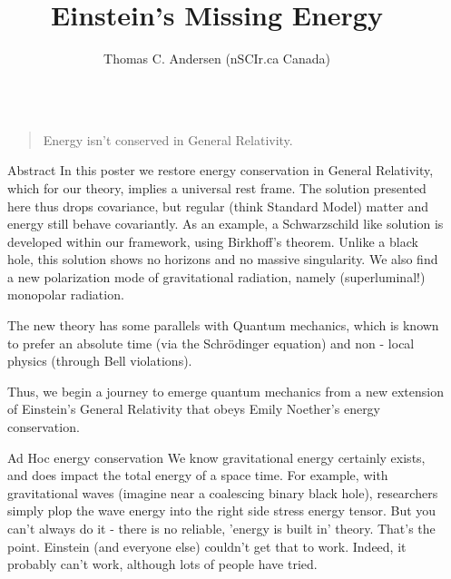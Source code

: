 \documentclass[final]{beamer}
\title{Einstein's Missing Energy}
\author{Thomas C. Andersen (nSCIr.ca Canada)}
\newlength{\sepwidth}
\newlength{\colwidth}
\newcommand{\separatorcolumn}{\begin{column}{\sepwidth}\end{column}}
\begin{document}

\begin{frame}[t]
\begin{columns}[t]
\separatorcolumn


\begin{column}{\colwidth}
\begin{quotation}
Energy isn't conserved in General Relativity.
\end{quotation}

  \begin{block}{Abstract}
In this poster we restore energy conservation in General Relativity, which for our theory, implies a universal rest frame. The solution presented here thus drops covariance, but regular (think Standard Model) matter and energy still behave covariantly. As an example, a Schwarzschild like solution is developed within our framework, using Birkhoff's theorem. Unlike a black hole, this solution shows no horizons and no massive singularity. We also find a new polarization mode of gravitational radiation, namely (superluminal!) monopolar radiation.

The new theory has some parallels with Quantum mechanics, which is known to prefer an absolute time (via the Schrödinger equation) and non - local physics (through Bell violations).

Thus, we begin a journey to emerge quantum mechanics from a new extension of Einstein's General Relativity that obeys Emily Noether's energy conservation. 

  \end{block}

  \begin{block}{Ad Hoc energy conservation}
  	We know gravitational energy certainly exists, and does impact the total energy of a space time. For example, with gravitational waves (imagine near a coalescing binary black hole), researchers simply plop the wave energy into the right side stress energy tensor. But you can't always do it - there is no reliable, 'energy is built in' theory. That's the point. Einstein (and everyone else) couldn't get that to work. Indeed, it probably can't work, although lots of people have tried.


\end{block}
\end{column}
\end{columns}
\end{frame}
\end{document}
